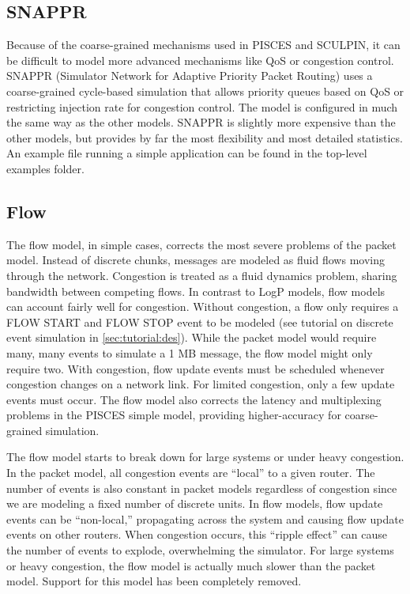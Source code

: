 \subsection{SNAPPR}
Because of the coarse-grained mechanisms used in PISCES and SCULPIN, it can be difficult to model more advanced mechanisms like QoS or congestion control. 
SNAPPR (Simulator Network for Adaptive Priority Packet Routing) uses a coarse-grained cycle-based simulation that allows priority queues based on QoS or restricting injection rate for congestion control. The model is configured in much the same way as the other models.  SNAPPR is slightly more expensive than the other models, but provides by far the most flexibility and most detailed statistics.
An example file running a simple application can be found in the top-level examples folder.

\subsection{Flow}
\label{subsec:tutorial:flow}
The flow model, in simple cases, corrects the most severe problems of the packet model.
Instead of discrete chunks, messages are modeled as fluid flows moving through the network.
Congestion is treated as a fluid dynamics problem, sharing bandwidth between competing flows.
In contrast to LogP models, flow models can account fairly well for congestion.
Without congestion, a flow only requires a FLOW START and FLOW STOP event to be modeled (see tutorial on discrete event simulation in \ref{sec:tutorial:des}).
While the packet model would require many, many events to simulate a 1 MB message, the flow model might only require two.
With congestion, flow update events must be scheduled whenever congestion changes on a network link.
For limited congestion, only a few update events must occur.
The flow model also corrects the latency and multiplexing problems in the PISCES simple model, providing higher-accuracy for coarse-grained simulation.

The flow model starts to break down for large systems or under heavy congestion.
In the packet model, all congestion events are ``local'' to a given router.
The number of events is also constant in packet models regardless of congestion since we are modeling a fixed number of discrete units.
In flow models, flow update events can be ``non-local,'' propagating across the system and causing flow update events on other routers.
When congestion occurs, this ``ripple effect'' can cause the number of events to explode, overwhelming the simulator.
For large systems or heavy congestion, the flow model is actually much slower than the packet model. Support for this model has been completely removed.
